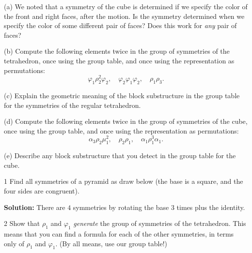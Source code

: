 \begin{problem}[Warmup]{(a)}
    We noted that a symmetry of the cube is determined if we specify the color of the front and right faces, after the motion. Is the symmetry determined when we specify the color of some different pair of faces? Does this work for \emph{any} pair of faces?
\end{problem}
\unsolved

\begin{problem}[Warmup]{(b)}
    Compute the following elements twice in the group of symmetries of the tetrahedron, once using the group table, and once using the representation as permutations: \[\varphi_1\rho_2^2\varphi_2, \quad \varphi_2\varphi_1\varphi_2, \quad \rho_1\rho_3.\]
\end{problem}
\unsolved

\begin{problem}[Warmup]{(c)}
    Explain the geometric meaning of the block substructure in the group table for the symmetries of the regular tetrahedron.
\end{problem}
\unsolved

\begin{problem}[Warmup]{(d)}
    Compute the following elements twice in the group of symmetries of the cube, once using the group table, and once using the representation as permutations: \[\alpha_3\rho_2\mu_1^2, \quad \rho_2\rho_1, \quad \alpha_1\rho_1^3\alpha_1.\]
\end{problem}
\unsolved

\begin{problem}[Warmup]{(e)}
    Describe any block substructure that you detect in the group table for the cube.
\end{problem}
\unsolved

\begin{problem}{1}
    Find all symmetries of a pyramid as draw below 
    (the base is a square, and the four sides are congruent).
\end{problem}
\solved

\textbf{Solution:}
There are $4$ symmetries by rotating the base $3$ times plus the identity.

\begin{problem}{2}
    Show that $\rho_1$ and $\varphi_1$ \emph{generate} the group of symmetries of the
    tetrahedron. This means that you can find a formula for each of the other symmetries,
    in terms only of $\rho_1$ and $\varphi_1$. (By all means, use our group table!)
\end{problem}
\unsolved


